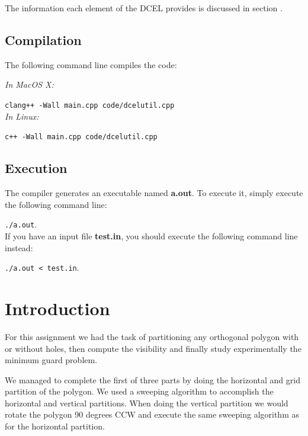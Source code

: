 \documentclass[12pt,a4paper,oneside]{article}
\begin{document}
The information each element of the DCEL provides is discussed in section . %

\subsection{Compilation}\label{subsec:compile}

The following command line compiles the code:

\textit{In MacOS X:}

\texttt{clang++ -Wall main.cpp code/dcelutil.cpp}\\

\textit{In Linux:}

\texttt{c++ -Wall main.cpp code/dcelutil.cpp}

\subsection{Execution}

The compiler generates an executable named \textbf{a.out}. To execute it, simply execute the following command line:

\texttt{./a.out}.\\

If you have an input file \textbf{test.in}, you should execute the following command line instead:

\texttt{./a.out < test.in}.

\section{Introduction}
For this assignment we had the task of partitioning any orthogonal polygon with or without holes, then compute the visibility and finally study experimentally the minimum guard problem. 

We managed to complete the first of three parts by doing the horizontal and grid partition of the polygon.
We used a sweeping algorithm to accomplish the horizontal and vertical partitions. 
When doing the vertical partition we would rotate the polygon 90 degrees CCW and execute the same sweeping algorithm as for the horizontal partition.

\end{document}

